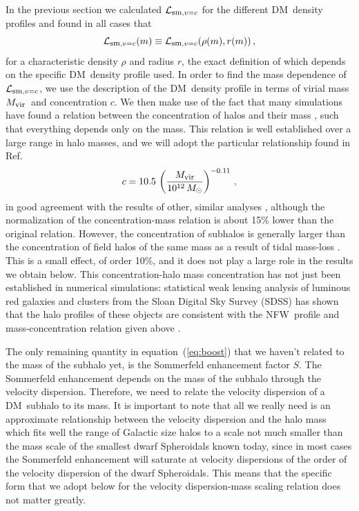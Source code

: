 \documentclass[aps,prd,twocolumn,amsmath,amssymb,floatfix,nofootinbib,10pt]{revtex4}
\newcommand{\NFW}{NFW}
\newcommand{\DM}{DM}
\newcommand{\somm}{\ensuremath{S}}
\newcommand{\eqnname}{equation}
\newcommand{\lum}{\ensuremath{\mathcal{L}}}
\newcommand{\lumsmoothc}{\ensuremath{\lum_{\mbox{{\footnotesize sm}},v=c}}}
\newcommand{\Msol}{\ensuremath{M_{\odot}}}
\newcommand{\Mvir}{\ensuremath{M_{\mbox{{\footnotesize vir}}}}}
\newcommand{\conc}{\ensuremath{c}}
\newcommand{\SDSS}{SDSS}
\begin{document}
In the previous section we calculated $\lumsmoothc$ for the different
\DM\ density profiles and found in all cases that
\begin{equation}
\lumsmoothc(m) \equiv \lumsmoothc(\rho(m),r(m))\, ,
\end{equation}
for a characteristic density $\rho$ and radius $r$, the exact
definition of which depends on the specific \DM\ density profile
used. In order to find the mass dependence of $\lumsmoothc$, we use
the description of the \DM\ density profile in terms of virial mass
\Mvir\ and concentration \conc. We then make use of the fact that many
simulations have found a relation between the concentration of halos
and their mass
\cite{2001MNRAS.321..559B,2001ApJ...554..114E,2008MNRAS.387..536G,2007MNRAS.381.1450N},
such that everything depends only on the mass. This relation is well
established over a large range in halo masses, and we will adopt the
particular relationship found in Ref.~\cite{2007MNRAS.378...55M}
\begin{equation}\label{eq:concscaling}
\conc = 10.5 \, \left(\frac{\Mvir}{10^{12}\, \Msol}\right)^{-0.11}\, ,
\end{equation}
in good agreement with the results of other, similar analyses
\cite{2001MNRAS.321..559B,2005MNRAS.357..387K}, although the
normalization of the concentration-mass relation is about 15\% lower
than the original relation. However, the concentration of subhalos is
generally larger than the concentration of field halos of the same
mass as a result of tidal mass-loss
\cite{1998MNRAS.300..146G,2008ApJ...673..226P,2004MNRAS.355..794H,2005ApJ...635..931B,2004ApJ...608..663K}. This
is a small effect, of order 10\%, and it does not play a large role in
the results we obtain below. This concentration-halo mass
concentration has not just been established in numerical simulations:
statistical weak lensing analysis of luminous red galaxies and
clusters from the Sloan Digital Sky Survey (\SDSS) has shown that the
halo profiles of these objects are consistent with the \NFW\ profile
and mass-concentration relation given above
\cite{2008JCAP...08..006M}.

The only remaining quantity in \eqnname\ (\ref{eq:boost}) that we
haven't related to the mass of the subhalo yet, is the Sommerfeld
enhancement factor \somm. The Sommerfeld enhancement depends on the
mass of the subhalo through the velocity dispersion. Therefore, we
need to relate the velocity dispersion of a \DM\ subhalo to its
mass. It is important to note that all we really need is an
approximate relationship between the velocity dispersion and the halo
mass which fits well the range of Galactic size halos to a scale not
much smaller than the mass scale of the smallest dwarf Spheroidals
known today, since in most cases the Sommerfeld enhancement will
saturate at velocity dispersions of the order of the velocity
dispersion of the dwarf Spheroidals. This means that the specific form
that we adopt below for the velocity dispersion-mass scaling relation
does not matter greatly.
\end{document}
